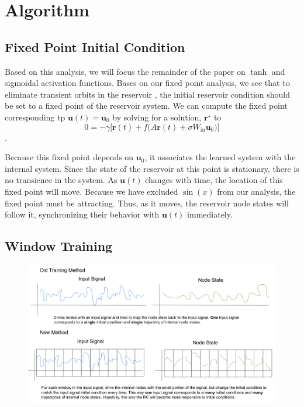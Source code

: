 \documentclass[journal]{journal}
\begin{document}
\section{Algorithm}

\subsection{Fixed Point Initial Condition}
Based on this analysis, we will focus the remainder of the paper on $\tanh$ and sigmoidal activation functions. Bases on our fixed point analysis, we see that to eliminate transient orbits in the reservoir , the initial reservoir condition should be set to a fixed point of the reservoir system. We can compute the fixed point corresponding tp $\mathbf{u}(t) = \mathbf{u}_0$ by solving for a solution, $\mathbf{r}^\star$ to
\[
0 = -\gamma\big[\mathbf{r}(t) + f\big(A\mathbf{r}(t) + \sigma W_\text{in} \mathbf{u}_0\big)\big]
\].

Because this fixed point depends on $\mathbf{u}_0$, it associates the learned system with the internal system. Since the state of the reservoir at this point is stationary, there is no transience in the system. As $\mathbf{u}(t)$ changes with time, the location of this fixed point will move. Because we have excluded $\sin(x)$ from our analysis, the fixed point must be attracting. Thus, as it moves, the reservoir node states will follow it, synchronizing their behavior with $\mathbf{u}(t)$ immediately.
\subsection{Window Training}
\begin{figure}
\includegraphics[scale=.3]{Images/algoexample.png}
\end{figure}
\end{document}
